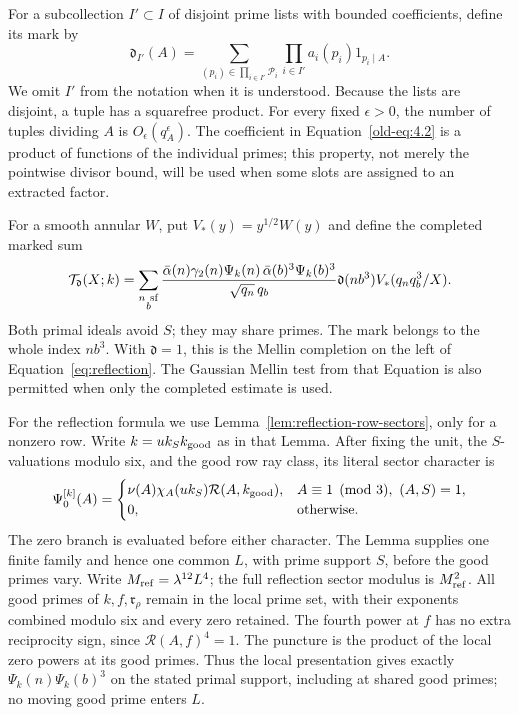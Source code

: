 \documentclass[11pt,a4paper]{article}
\numberwithin{equation}{section}
\numberwithin{figure}{section}
\theoremstyle{definition}
\theoremstyle{remark}
\begin{document}
For a subcollection \(I'\subset I\) of disjoint prime lists with bounded
coefficients, define its mark by
\begin{equation}\label{old-eq:4.2}
 \mathfrak d_{I'}(A)=
 \sum_{(p_i)\in\prod_{i\in I'}\mathcal P_i}
      \prod_{i\in I'}a_i(p_i)1_{p_i\mid A}.
\end{equation}
We omit \(I'\) from the notation when it is understood.  Because the lists
are disjoint, a tuple has a squarefree product.  For every fixed
\(\epsilon>0\), the number of tuples dividing \(A\) is
\(O_\epsilon(q_A^\epsilon)\).  The coefficient in
Equation~\eqref{old-eq:4.2} is a product of functions of the individual
primes; this property, not merely the pointwise divisor bound, will be
used when some slots are assigned to an extracted factor.

For a smooth annular \(W\), put \(V_*(y)=y^{1/2}W(y)\) and define the completed marked sum
\begin{equation}\label{eq:marked-completion}
 \mathcal T_{\mathfrak d}(X;k)=
 \sum_{\substack{n\ {\rm sf}\\b}}
 \frac{\bar\alpha(n)\gamma_2(n)\Psi_k(n)\,
       \bar\alpha(b)^3\Psi_k(b)^3}{\sqrt{q_n}\,q_b}
 \mathfrak d(nb^3)V_*(q_nq_b^3/X).
\end{equation}
Both primal ideals avoid \(S\); they may share primes.  The mark belongs
to the whole index \(nb^3\).  With \(\mathfrak d=1\), this is the Mellin
completion on the left of Equation~\eqref{eq:reflection}.  The Gaussian
Mellin test from that Equation is also permitted when only the completed
estimate is used.

For the reflection formula we use Lemma~\ref{lem:reflection-row-sectors},
only for a nonzero row.  Write \(k=u k_S k_{\rm good}\) as in that Lemma.
After fixing the unit, the \(S\)-valuations modulo six, and the good row ray
class, its literal sector character is
\[
 \Psi_0^{[k]}(A)=
 \begin{cases}
 \nu(A)\chi_A(u k_S)\mathcal R(A,k_{\rm good}),
       &A\equiv1\pmod3,\ (A,S)=1,\\
 0,&\text{otherwise}.
 \end{cases}
\]
The zero branch is evaluated before either character.  The Lemma supplies
one finite family and hence one common \(L\), with prime support \(S\), before
the good primes vary.  Write \(M_{\rm ref}=\lambda^{12}L^4\); the full
reflection sector modulus is \(M_{\rm ref}^2\).  All good primes of
\(k,f,\mathfrak r_\rho\) remain in the local prime set, with their exponents
combined modulo six and every zero retained.  The fourth power at \(f\) has
no extra reciprocity sign, since \(\mathcal R(A,f)^4=1\).  The puncture is
the product of the local zero powers at its good primes.  Thus the local
presentation gives exactly \(\Psi_k(n)\Psi_k(b)^3\) on the stated primal
support, including at shared good primes; no moving good prime enters \(L\).
\end{document}
